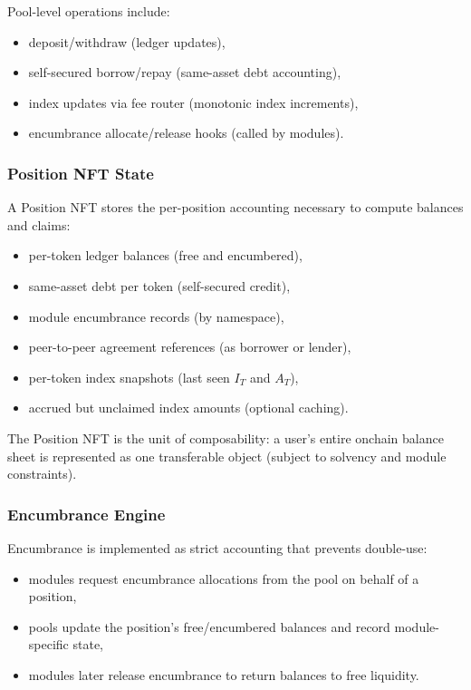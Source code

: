 \documentclass[version=preprint]{iacrcc}
\begin{document}
Pool-level operations include:
\begin{itemize}
  \item deposit/withdraw (ledger updates),
  \item self-secured borrow/repay (same-asset debt accounting),
  \item index updates via fee router (monotonic index increments),
  \item encumbrance allocate/release hooks (called by modules).
\end{itemize}

\subsubsection{Position NFT State}

A Position NFT stores the per-position accounting necessary to compute balances and claims:
\begin{itemize}
  \item per-token ledger balances (free and encumbered),
  \item same-asset debt per token (self-secured credit),
  \item module encumbrance records (by namespace),
  \item peer-to-peer agreement references (as borrower or lender),
  \item per-token index snapshots (last seen $I_T$ and $A_T$),
  \item accrued but unclaimed index amounts (optional caching).
\end{itemize}

The Position NFT is the unit of composability: a user’s entire onchain balance sheet is represented as one transferable object (subject to solvency and module constraints).

\subsubsection{Encumbrance Engine}

Encumbrance is implemented as strict accounting that prevents double-use:
\begin{itemize}
  \item modules request encumbrance allocations from the pool on behalf of a position,
  \item pools update the position’s free/encumbered balances and record module-specific state,
  \item modules later release encumbrance to return balances to free liquidity.
\end{itemize}
\end{document}
